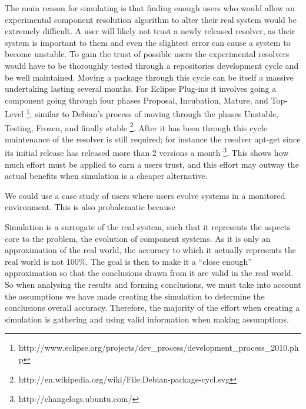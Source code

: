 The main reason for simulating is that finding enough users
who would allow an experimental component resolution algorithm to alter their real system would be extremely difficult.
A user will likely not trust a newly released resolver, as their system is important to them and even the slightest error can cause
a system to become unstable. 
To gain the trust of possible users the experimental resolvers would have to be thoroughly tested through a repositories development cycle and be well maintained.
Moving a package through this cycle can be itself a massive undertaking lasting several months. 
For Eclipse Plug-ins it involves going a component going through four phases 
Proposal, Incubation, Mature, and Top-Level \footnote{http://www.eclipse.org/projects/dev\_process/development\_process\_2010.php};
similar to Debian's process of moving through the phases Unstable, Testing, Frozen, and finally stable \footnote{http://en.wikipedia.org/wiki/File:Debian-package-cycl.svg}.
After it has been through this cycle maintenance of the resolver is still required; 
for instance the resolver apt-get since its initial release has released more than 2 versions a month \footnote{http://changelogs.ubuntu.com/}.
This shows how much effort must be applied to earn a users trust, and this effort may outway the actual benefits when simulation is a cheaper alternative.

We could use a case study of users where users evolve systems in a monitored environment.
This is also probalematic because

Simulation is a surrogate of the real system, such that it represents the aspects core to the problem, 
the evolution of component systems.
As it is only an approximation of the real world, 
the accuracy to which it actually represents the real world is not 100\%.
The goal is then to make it a ``close enough'' approximation so that the conclusions drawn from it are valid in the real world.
So when analysing the results and forming conclusions, we must take into account the assumptions we have made creating the simulation to determine 
the conclusions overall accuracy.
Therefore, the majority of the effort when creating a simulation is gathering and using valid information when making assumptions.

